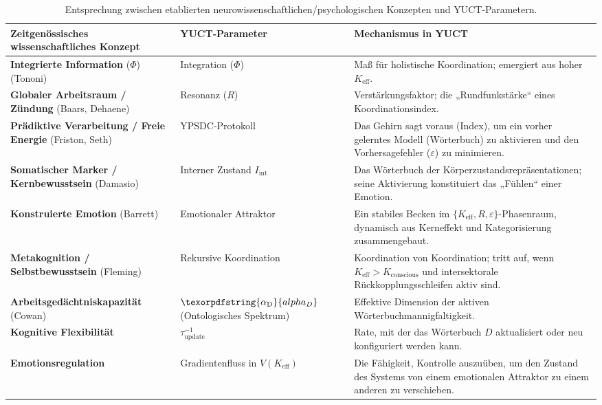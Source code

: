 \documentclass[12pt,a4paper]{article}
\DeclareRobustCommand{\alD}{\texorpdfstring{\ensuremath{\alpha_{\mathrm{D}}}}{alpha_D}}
\begin{document}
	\begin{table}[H]
		\centering
		\caption{Entsprechung zwischen etablierten neurowissenschaftlichen/psychologischen Konzepten und YUCT‑Parametern.}
		\label{tab:mapping}
		\begin{tabular}{p{4.5cm} p{4cm} p{5cm}}
			\toprule
			\textbf{Zeitgenössisches wissenschaftliches Konzept} & \textbf{YUCT‑Parameter} & \textbf{Mechanismus in YUCT} \\
			\midrule
			\textbf{Integrierte Information} (\(\Phi\)) (Tononi) & Integration (\(\Phi\)) & Maß für holistische Koordination; emergiert aus hoher \(K_{\mathrm{eff}}\). \\
			\textbf{Globaler Arbeitsraum / Zündung} (Baars, Dehaene) & Resonanz (\(R\)) & Verstärkungsfaktor; die „Rundfunkstärke“ eines Koordinationsindex. \\
			\textbf{Prädiktive Verarbeitung / Freie Energie} (Friston, Seth) & YPSDC‑Protokoll & Das Gehirn sagt voraus (Index), um ein vorher gelerntes Modell (Wörterbuch) zu aktivieren und den Vorhersagefehler (\(\varepsilon\)) zu minimieren. \\
			\textbf{Somatischer Marker / Kernbewusstsein} (Damasio) & Interner Zustand \(I_{\mathrm{int}}\) & Das Wörterbuch der Körperzustandsrepräsentationen; seine Aktivierung konstituiert das „Fühlen“ einer Emotion. \\
			\textbf{Konstruierte Emotion} (Barrett) & Emotionaler Attraktor & Ein stabiles Becken im \(\{K_{\mathrm{eff}}, R, \varepsilon\}\)-Phasenraum, dynamisch aus Kerneffekt und Kategorisierung zusammengebaut. \\
			\textbf{Metakognition / Selbstbewusstsein} (Fleming) & Rekursive Koordination & Koordination von Koordination; tritt auf, wenn \(K_{\mathrm{eff}} > K_{\mathrm{conscious}}\) und intersektorale Rückkopplungsschleifen aktiv sind. \\
			\textbf{Arbeitsgedächtniskapazität} (Cowan) & \(\alD\) (Ontologisches Spektrum) & Effektive Dimension der aktiven Wörterbuchmannigfaltigkeit. \\
			\textbf{Kognitive Flexibilität} & \(\tau_{\mathrm{update}}^{-1}\) & Rate, mit der das Wörterbuch \(D\) aktualisiert oder neu konfiguriert werden kann. \\
			\textbf{Emotionsregulation} & Gradientenfluss in \(V(K_{\mathrm{eff}})\) & Die Fähigkeit, Kontrolle auszuüben, um den Zustand des Systems von einem emotionalen Attraktor zu einem anderen zu verschieben. \\
			\bottomrule
		\end{tabular}
	\end{table}
	
\end{document}
